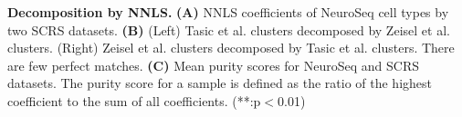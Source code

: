 \textbf{Decomposition by NNLS.}
\textbf{(A)} NNLS coefficients of NeuroSeq cell types by two SCRS datasets.
\textbf{(B)} (Left) Tasic et al. clusters decomposed by Zeisel et al. clusters. (Right) Zeisel et al. clusters decomposed by Tasic et al. clusters. There are few perfect matches.
\textbf{(C)} Mean purity scores for NeuroSeq and SCRS datasets. The purity score for a sample is defined as the ratio of the highest coefficient to the sum of all coefficients. (**:p$<$0.01)



